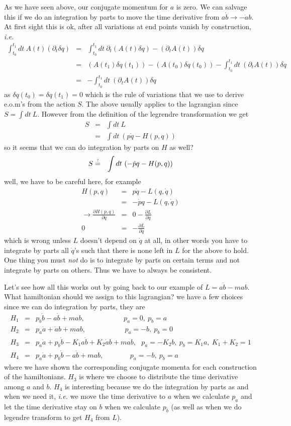 \documentclass[aps,preprint,preprintnumbers,nofootinbib,showpacs,prd]{revtex4-1}
\newcommand{\ie}{{\it i.e.} }
\newcommand{\nbea}{\begin{eqnarray*}}
\newcommand{\neea}{\end{eqnarray*}}
\begin{document}
As we have seen above, our conjugate momentum for $a$ is zero. We can salvage this if we do an integration by parts to move the time derivative from $a\dot b \to -\dot a b$. At first sight this is ok, after all variations at end points vanish by construction, \ie
%
\nbea
\int_{t_0}^{t_1} dt~A(t) (\partial_t \delta q) & = & \int_{t_0}^{t_1} dt~\partial_t(A(t) \delta q) - (\partial_t A(t)) \delta q \\
& = & (A(t_1) \delta q(t_1)) - (A(t_0) \delta q(t_0)) - \int_{t_0}^{t_1} dt~ (\partial_t A(t)) \delta q  \\
& = & - \int_{t_0}^{t_1} dt~ (\partial_t A(t)) \delta q 
\neea
%
as $\delta q(t_0)=\delta q(t_1)=0$ which is the rule of variations that we use to derive e.o.m's from the action $S$. The above usually applies to the lagrangian since $S = \int dt~L$. However from the definition of the legrendre transformation we get
%
\nbea
S & = & \int dt~L \\
& = & \int dt ~ ( p\dot q - H(p,q))
\neea
%
so it seems that we can do integration by parts on $H$ as well?
%
\nbea
S & \stackrel{\text{\tiny ?}}{=} & \int dt ~ (-\dot p q - H(p,q))
\neea
%
well, we have to be careful here, for example
%
\nbea
H(p,q) & = & p\dot q - L(q, \dot q) \\
& = & -\dot p q - L(q, \dot q) \\
\to \frac{\partial H(p,q)}{\partial \dot q} & = & 0 - \frac{\partial L}{\partial \dot q} \\
0 & = & - \frac{\partial L}{\partial \dot q}
\neea
%
which is wrong unless $L$ doesn't depend on $\dot q$ at all, in other words you have to integrate by parts all $\dot q$'s such that there is none left in $L$ for the above to hold. One thing you must {\it not} do is to integrate by parts on certain terms and not integrate by parts on others. Thus we have to always be consistent.

Let's see how all this works out by going back to our example of $L = a\dot b - mab$. What hamiltonian should we assign to this lagrangian? we have a few choices since we can do integration by parts, they are
%
\nbea
H_1 & = & p_b \dot b - a\dot b + mab, ~~~~~~~~~~~~~~~~~~~~~~~~~p_a = 0,~ p_b = a \\
H_2 & = & p_a \dot a + \dot a b + mab, ~~~~~~~~~~~~~~~~~~~~~~~~~p_a = -b,~ p_b = 0 \\
H_3 & = & p_a \dot a + p_b \dot b - K_1 a \dot b + K_2\dot a b + mab, ~~~p_a = -K_2 b, ~p_b = K_1 a,~ K_1 + K_2 = 1 \\
H_4 & = & p_a \dot a + p_b \dot b - a \dot b + mab, ~~~~~~~~~~~~~~~~~p_a = - b, ~p_b = a
\neea
%
where we have shown the corresponding conjugate momenta for each construction of the hamiltonians. $H_3$ is where we choose to distribute the time derivative among $a$ and $b$. $H_4$ is interesting because we do the integration by parts as and when we need it, \ie we move the time derivative to $a$ when we calculate $p_a$ and let the time derivative stay on $b$ when we calculate $p_b$ (as well as when we do legendre transform to get $H_4$ from $L$). 
\end{document}
